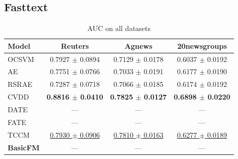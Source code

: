 \subsection {Fasttext}

\begin{table}[H]
\centering
\caption{AUC on all datasets}
\begin{tabular}{lccc}
\toprule
Model & Reuters & Agnews & 20newsgroups \\
\midrule
OCSVM & 0.7927 $\pm$ 0.0894 & 0.7129 $\pm$ 0.0178 & 0.6037 $\pm$ 0.0192 \\
AE & 0.7751 $\pm$ 0.0766 & 0.7033 $\pm$ 0.0191 & 0.6177 $\pm$ 0.0190 \\
\midrule
RSRAE & 0.7287 $\pm$ 0.0718 & 0.7066 $\pm$ 0.0185 & 0.6174 $\pm$ 0.0192 \\
CVDD & \textbf{0.8816 $\pm$ 0.0410} & \textbf{0.7825 $\pm$ 0.0127} & \textbf{0.6898 $\pm$ 0.0220} \\
DATE & — & — & — \\
FATE & — & — & — \\
\midrule
TCCM & \underline{0.7930 $\pm$ 0.0906} & \underline{0.7810 $\pm$ 0.0163} & \underline{0.6277 $\pm$ 0.0189} \\
\textbf{BasicFM} & — & — & — \\
\bottomrule
\end{tabular}
\label{tab:global}
\end{table}


